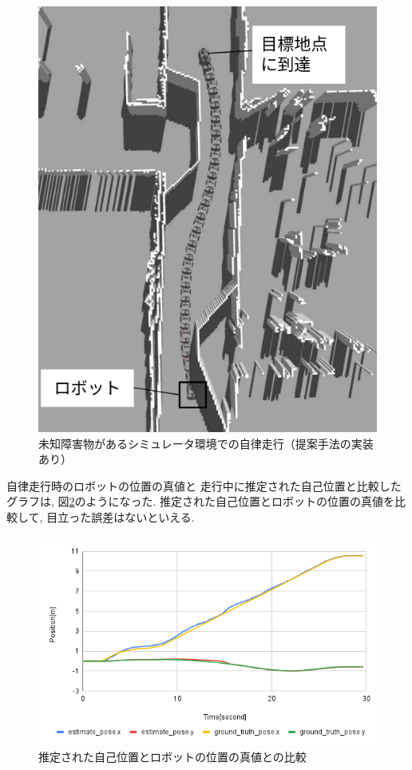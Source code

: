 \begin{figure}[H]
  \begin{center}
    \includegraphics[width=0.5\linewidth]{figs/no_implementation_no_reset.png}
    \caption{未知障害物があるシミュレータ環境での自律走行（提案手法の実装あり）}
    \label{fig:nav_imp}
  \end{center}
\end{figure}

自律走行時のロボットの位置の真値と
走行中に推定された自己位置と比較したグラフは, 図\ref{fig:odom_comp_imp}のようになった. 
推定された自己位置とロボットの位置の真値を比較して, 目立った誤差はないといえる. 

\begin{figure}[H]
  \begin{center}
    \includegraphics[width=0.98\linewidth]{figs/sim_imp_ground_truth.png}
    \caption{推定された自己位置とロボットの位置の真値との比較}
    \label{fig:odom_comp_imp}
  \end{center}
\end{figure}

